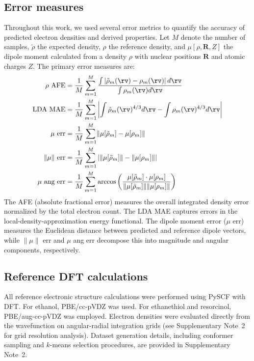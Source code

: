 \documentclass[12pt]{article}
\begin{document}
\subsection{Error measures}\label{sec:error_measures}
Throughout this work, we used several error metrics to quantify the accuracy of predicted electron densities and derived properties. Let $M$ denote the number of samples, $\tilde{\rho}$ the expected density, $\rho$ the reference density, and $\mu[\rho, \mathbf{R}, Z]$ the dipole moment calculated from a density $\rho$ with nuclear positions $\mathbf{R}$ and atomic charges $Z$. The primary error measures are:
\begin{equation*}
\begin{aligned}
\rho\text{ AFE} &= \frac{1}{M}\sum_{m=1}^{M}\frac{\int \left|\tilde{\rho}_{m}(\rv) - \rho_m(\rv) \right| d\rv}{\int \rho_m(\rv) d\rv}\\
\text{LDA MAE} &= \frac{1}{M}\sum_{m=1}^{M}\left| \int \tilde{\rho}_{m}(\rv)^{4/3}d\rv - \int \rho_m(\rv)^{4/3}d\rv\right| \\
\mu\text{ err} &= \frac{1}{M}\sum_{m=1}^{M}\lVert \mu[\tilde{\rho}_{m}] - \mu[\rho_m] \rVert\\
\lVert\mu\rVert\text{ err} &= \frac{1}{M}\sum_{m=1}^{M}\left| \lVert\mu[\tilde{\rho}_{m}]\rVert - \lVert \mu[\rho_m]\rVert \right|\\
\mu \text{ ang err} &= \frac{1}{M}\sum_{m=1}^{M} \arccos{\left(\frac{\mu[\tilde{\rho}_{m}]\cdot\mu[\rho_{m}]}{\lVert\mu[\tilde{\rho}_{m}]\rVert \lVert\mu[\rho_{m}]\rVert}\right)}
\end{aligned}
\end{equation*}
The AFE (absolute fractional error) measures the overall integrated density error normalized by the total electron count. The LDA MAE captures errors in the local-density-approximation energy functional. The dipole moment error ($\mu$ err) measures the Euclidean distance between predicted and reference dipole vectors, while $\lVert\mu\rVert$ err and $\mu$ ang err decompose this into magnitude and angular components, respectively.

\subsection{Reference DFT calculations}\label{sec:ref_calc}
All reference electronic structure calculations were performed using PySCF with DFT.
For ethanol, PBE/cc-pVDZ was used. For ethanethiol and resorcinol, PBE/aug-cc-pVDZ was employed.
Electron densities were evaluated directly from the wavefunction on angular-radial integration grids (see Supplementary Note~2 for grid resolution analysis).
Dataset generation details, including conformer sampling and $k$-means selection procedures, are provided in Supplementary Note~2.
\end{document}
